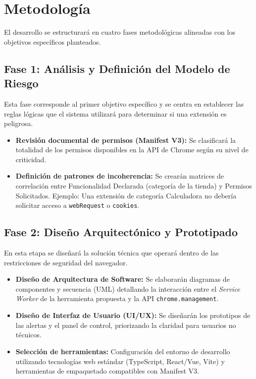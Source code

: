 \documentclass[12pt,oneside]{report}
\begin{document}
\endgroup


\chapter{Metodología}
\label{chap:metodologia}
\begingroup
\setlength{\parindent}{0pt}
\setlength{\parskip}{0.6em}

El desarrollo se estructurará en cuatro fases metodológicas alineadas con los objetivos específicos planteados.

\section{Fase 1: Análisis y Definición del Modelo de Riesgo}
Esta fase corresponde al primer objetivo específico y se centra en establecer las reglas lógicas que el sistema utilizará para determinar si una extensión es peligrosa.
\begin{itemize}
    \item \textbf{Revisión documental de permisos (Manifest V3):} Se clasificará la totalidad de los permisos disponibles en la API de Chrome según su nivel de criticidad.
    \item \textbf{Definición de patrones de incoherencia:} Se crearán matrices de correlación entre Funcionalidad Declarada (categoría de la tienda) y Permisos Solicitados. Ejemplo: Una extensión de categoría Calculadora no debería solicitar acceso a \texttt{webRequest} o \texttt{cookies}.
\end{itemize}

\section{Fase 2: Diseño Arquitectónico y Prototipado}
En esta etapa se diseñará la solución técnica que operará dentro de las restricciones de seguridad del navegador.
\begin{itemize}
    \item \textbf{Diseño de Arquitectura de Software:} Se elaborarán diagramas de componentes y secuencia (UML) detallando la interacción entre el \textit{Service Worker} de la herramienta propuesta y la API \texttt{chrome.management}.
    \item \textbf{Diseño de Interfaz de Usuario (UI/UX):} Se diseñarán los prototipos de las alertas y el panel de control, priorizando la claridad para usuarios no técnicos.
    \item \textbf{Selección de herramientas:} Configuración del entorno de desarrollo utilizando tecnologías web estándar (TypeScript, React/Vue, Vite) y herramientas de empaquetado compatibles con Manifest V3.
\end{itemize}
\end{document}
